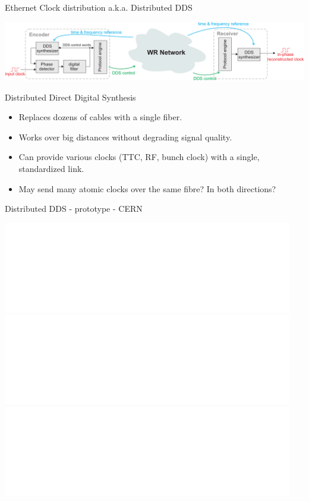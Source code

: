 \documentclass[compress,red]{beamer}
\begin{document}
\begin{frame}{Ethernet Clock distribution a.k.a. Distributed DDS}
  \begin{center}
    \includegraphics[width=\columnwidth]{../../figures/applications/remote_dds.pdf}
  \end{center}
  \begin{block}{Distributed Direct Digital Synthesis}
    \begin{itemize}
    \item Replaces dozens of cables with a single fiber.
    \item Works over big distances without degrading signal quality.
    \item Can provide various clocks (TTC, RF, bunch clock) with a single, standardized link.
    \item May send many atomic clocks over the same fibre? In both directions?
    \end{itemize}
  \end{block}
\end{frame}



\begin{frame}{Distributed DDS - prototype - CERN}
  \begin{center}
    \includegraphics<1>[width=0.95\textwidth]{../../figures/applications/rf_demo6.pdf} \pause
    \includegraphics<2>[width=0.95\textwidth]{../../figures/applications/rf_demo5.pdf} \pause
    \includegraphics<3>[width=0.95\textwidth]{../../figures/applications/rf_demo8.pdf}
    \end{center}
\end{frame}
\end{document}
